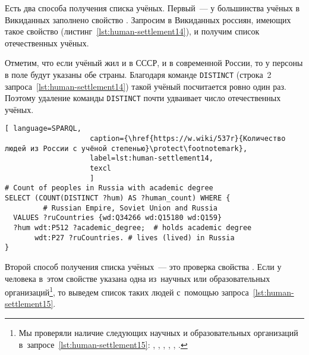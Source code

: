 Есть два способа получения списка учёных. 
Первый~--- у большинства учёных в Викиданных заполнено свойство . 
Запросим в Викиданных россиян, имеющих такое свойство (листинг~\ref{lst:human-settlement14}), 
и получим список отечественных учёных. 


Отметим, что если учёный жил и в СССР, и в современной России, 
то у персоны в поле  будут указаны обе страны.  
Благодаря команде \lstinline|DISTINCT| (строка~2 запроса~\ref{lst:human-settlement14}) 
такой учёный посчитается ровно один раз. 
Поэтому удаление команды \lstinline|DISTINCT| почти удваивает число отечественных учёных. 

\begin{lstlisting}[ language=SPARQL, 
                    caption={\href{https://w.wiki/537r}{Количество людей из России с учёной степенью}\protect\footnotemark},
                    label=lst:human-settlement14,
                    texcl 
                    ]
# Count of peoples in Russia with academic degree
SELECT (COUNT(DISTINCT ?hum) AS ?human_count) WHERE {
         # Russian Empire, Soviet Union and Russia
  VALUES ?ruCountries {wd:Q34266 wd:Q15180 wd:Q159}
  ?hum wdt:P512 ?academic_degree;  # holds academic degree 
       wdt:P27 ?ruCountries. # lives (lived) in Russia
}
\end{lstlisting}%

Второй способ получения списка учёных~--- это проверка свойства . 
Если у человека в~этом свойстве указана одна из~научных или образовательных организаций\footnote{%
%
%
Мы проверяли наличие следующих научных и образовательных организаций
в~запросе~\ref{lst:human-settlement15}: 
, , 
, , 
, .%
},  %
то выведем список таких людей с~помощью запроса~\ref{lst:human-settlement15}. 

